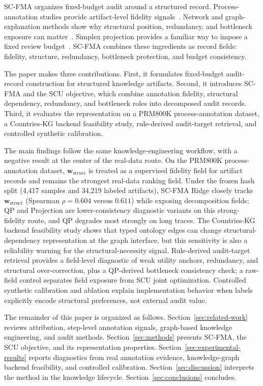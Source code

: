 \documentclass[a4paper,fleqn]{cas-sc}
\newcommand{\wstruct}{\ensuremath{\mathbf{w}_{\mathrm{struct}}}}
\begin{document}
SC-FMA organizes fixed-budget audit around a structured record. Process-annotation studies provide artifact-level fidelity signals~\cite{lightman2023verify,uesato2022solving}. Network and graph-explanation methods show why structural position, redundancy, and bottleneck exposure can matter~\cite{albert2000error,newman2010networks,ying2019gnnexplainer}. Simplex projection provides a familiar way to impose a fixed review budget~\cite{wang2013projection}. SC-FMA combines these ingredients as record fields: fidelity, structure, redundancy, bottleneck protection, and budget consistency.

The paper makes three contributions. First, it formulates fixed-budget audit-record construction for structured knowledge artifacts. Second, it introduces SC-FMA and the SCU objective, which combine annotation fidelity, structural dependency, redundancy, and bottleneck roles into decomposed audit records. Third, it evaluates the representation on a PRM800K process-annotation dataset, a Countries-KG backend feasibility study, rule-derived audit-target retrieval, and controlled synthetic calibration.

The main findings follow the same knowledge-engineering workflow, with a negative result at the center of the real-data route. On the PRM800K process-annotation dataset, \wstruct{} is treated as a supervised fidelity field for artifact records and remains the strongest real-data ranking field. Under the frozen hash split (4,417 samples and 34,219 labeled artifacts), SC-FMA Ridge closely tracks \wstruct{} (Spearman $\rho = 0.604$ versus $0.611$) while exposing decomposition fields; QP and Projection are lower-consistency diagnostic variants on this strong-fidelity route, and QP degrades most strongly on long traces. The Countries-KG backend feasibility study shows that typed ontology edges can change structural-dependency representation at the graph interface, but this sensitivity is also a reliability warning for the structural-necessity signal. Rule-derived audit-target retrieval provides a field-level diagnostic of weak utility anchors, redundancy, and structural over-correction, plus a QP-derived bottleneck consistency check; a raw-field control separates field exposure from SCU joint optimization. Controlled synthetic calibration and ablation explain implementation behavior when labels explicitly encode structural preferences, not external audit value.

The remainder of this paper is organized as follows. Section~\ref{sec:related-work} reviews attribution, step-level annotation signals, graph-based knowledge engineering, and audit methods. Section~\ref{sec:methods} presents SC-FMA, the SCU objective, and its representation properties. Section~\ref{sec:experimental-results} reports diagnostics from real annotation evidence, knowledge-graph backend feasibility, and controlled calibration. Section~\ref{sec:discussion} interprets the method in the knowledge lifecycle. Section~\ref{sec:conclusions} concludes.
\end{document}
